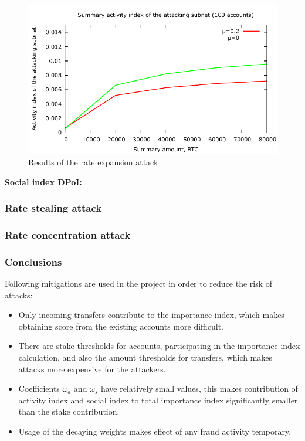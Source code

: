 \documentclass[a4paper,12pt]{article}
\begin{document}
\begin{figure}[H]
      \includegraphics[width=1\linewidth]{pictures/chain-attack-index-amount-relation.pdf}
      \caption{Results of the rate expansion attack}
      \label{fig:chain-attack-index-amount-relation}
\end{figure}
\textbf{Social index DPoI:} 
\subsubsection{Rate stealing attack}

\subsubsection{Rate concentration attack}

\subsubsection{Conclusions}
Following mitigations are used in the project in order to reduce the risk of attacks:

\begin{itemize}
  \item Only incoming transfers contribute to the importance index, which makes obtaining score from the existing accounts more difficult.
  \item There are stake thresholds for accounts, participating in the importance index calculation, and also the amount thresholds for transfers, which makes attacks more expensive for the attackers.
  \item Coefficients $\omega_a$ and $\omega_s$ have relatively small values, this makes contribution of activity index and social index to total importance index significantly smaller than the stake contribution.
  \item Usage of the decaying weights makes effect of any fraud activity temporary. 
\end{itemize}
\end{document}
